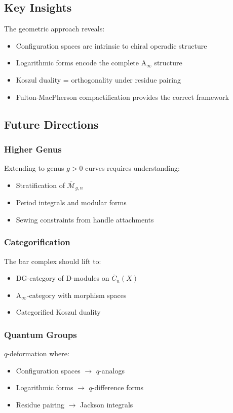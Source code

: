 \subsection{Key Insights}
 
The geometric approach reveals:
\begin{itemize}
\item Configuration spaces are intrinsic to chiral operadic structure
\item Logarithmic forms encode the complete A$_\infty$ structure
\item Koszul duality = orthogonality under residue pairing
\item Fulton-MacPherson compactification provides the correct framework
\end{itemize}
 
\subsection{Future Directions}
 
\subsubsection{Higher Genus}
Extending to genus $g > 0$ curves requires understanding:
\begin{itemize}
\item Stratification of $\overline{\mathcal{M}}_{g,n}$
\item Period integrals and modular forms
\item Sewing constraints from handle attachments
\end{itemize}
 
\subsubsection{Categorification}
The bar complex should lift to:
\begin{itemize}
\item DG-category of D-modules on $\overline{C}_n(X)$
\item A$_\infty$-category with morphism spaces
\item Categorified Koszul duality
\end{itemize}
 
\subsubsection{Quantum Groups}
$q$-deformation where:
\begin{itemize}
\item Configuration spaces $\to$ $q$-analogs
\item Logarithmic forms $\to$ $q$-difference forms
\item Residue pairing $\to$ Jackson integrals
\end{itemize}
 
